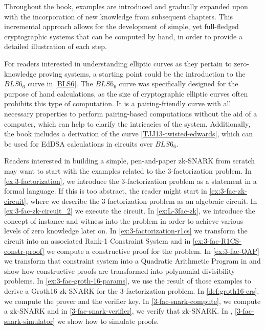 Throughout the book, examples are introduced and gradually expanded upon with the incorporation of new knowledge from subsequent chapters. This incremental approach allows for the development of simple, yet full-fledged cryptographic systems that can be computed by hand, in order to provide a detailed illustration of each step.

For readers interested in understanding elliptic curves as they pertain to zero-knowledge proving systems, a starting point could be the introduction to the $BLS6_6$ curve in \secname{} \ref{BLS6}. The $BLS6_6$ curve was specifically designed for the purpose of hand calculations, as the size of cryptographic elliptic curves often prohibits this type of computation. It is a pairing-friendly curve with all necessary properties to perform pairing-based computations without the aid of a computer, which can help to clarify the intricacies of the system. Additionally, the book includes a derivation of the  curve \ref{TJJ13-twisted-edwards}, which can be used for EdDSA calculations in circuits over $BLS6_6$.

Readers interested in building a simple, pen-and-paper zk-SNARK from scratch may want to start with the examples related to the 3-factorization problem. In \examplename{} \ref{ex:3-factorization}, we introduce the 3-factorization problem as a statement in a formal language. If this is too abstract, the reader might start in \examplename{} \ref{ex:3-fac-zk-circuit}, where we describe the 3-factorization problem as an algebraic circuit. In \examplename{} \ref{ex:3-fac-zk-circuit_2} we execute the circuit. In \examplename{} \ref{ex:L-3fac-zk}, we introduce the concept of instance and witness into the problem in order to achieve various levels of zero knowledge later on. In \examplename{} \ref{ex:3-factorization-r1cs} we transform the circuit into an associated Rank-1 Constraint System and in \examplename{} \ref{ex:3-fac-R1CS-constr-proof} we compute a constructive proof for the problem. In \examplename{} \ref{ex:3-fac-QAP} we transform that constraint system into a Quadratic Arithmetic Program in and show how constructive proofs are transformed into polynomial divisibility problems. In \examplename{} \ref{ex:3-fac-groth-16-params}, we  use the result of those examples to derive a Groth16 zk-SNARK for the 3-factorization problem. In \ref{def:groth16-crs}, we compute the prover and the verifier key. In \examplename{} \ref{3-fac-snark-compute}, we compute a zk-SNARK and in \examplename{} \ref{3-fac-snark-verifier}, we verify that zk-SNARK. In \examplename{}, \ref{3-fac-snark-simulator} we show how to simulate proofs. 

